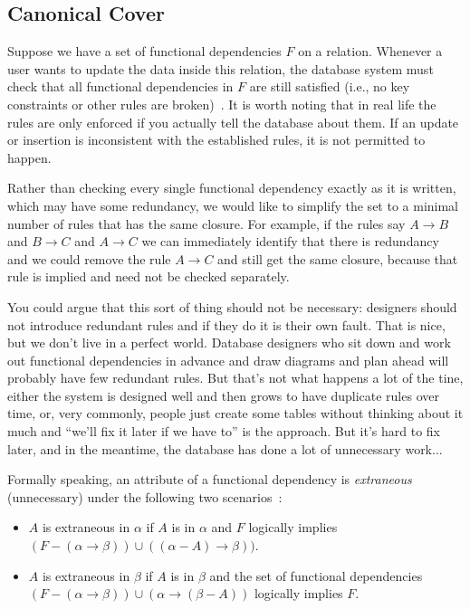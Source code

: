 \subsection*{Canonical Cover}
Suppose we have a set of functional dependencies $F$ on a relation. Whenever a user wants to update the data inside this relation, the database system must check that all functional dependencies in $F$ are still satisfied (i.e., no key constraints or other rules are broken)~\cite{dsc}. It is worth noting that in real life the rules are only enforced if you actually tell the database about them. If an update or insertion is inconsistent with the established rules, it is not permitted to happen.

Rather than checking every single functional dependency exactly as it is written, which may have some redundancy, we would like to simplify the set to a minimal number of rules that has the same closure. For example, if the rules say $A \rightarrow B$ and $B \rightarrow C$ and $A \rightarrow C$ we can immediately identify that there is redundancy and we could remove the rule $A \rightarrow C$ and still get the same closure, because that rule is implied and need not be checked separately.

You could argue that this sort of thing should not be necessary: designers should not introduce redundant rules and if they do it is their own fault. That is nice, but we don't live in a perfect world. Database designers who sit down and work out functional dependencies in advance and draw diagrams and plan ahead will probably have few redundant rules. But that's not what happens a lot of the tine, either the system is designed well and then grows to have duplicate rules over time, or, very commonly, people just create some tables without thinking about it much and ``we'll fix it later if we have to'' is the approach. But it's hard to fix later, and in the meantime, the database has done a lot of unnecessary work...

Formally speaking, an attribute of a functional dependency is \textit{extraneous} (unnecessary) under the following two scenarios~\cite{dsc}:
\begin{itemize}
	\item $A$ is extraneous in $\alpha$ if $A$ is in $\alpha$ and $F$ logically implies $(F - (\alpha \rightarrow \beta)) \cup ((\alpha - A) \rightarrow \beta))$.
	\item $A$ is extraneous in $\beta$ if $A$ is in $\beta$ and the set of functional dependencies $(F - (\alpha \rightarrow \beta)) \cup (\alpha \rightarrow (\beta - A))$ logically implies $F$.
\end{itemize}

